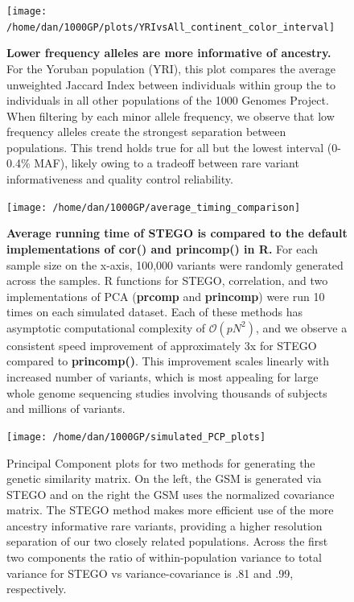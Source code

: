 \begin{figure}
\texttt{[image: /home/dan/1000GP/plots/YRIvsAll\_continent\_color\_interval]}\label{YRIvsX}\caption{\textbf{Lower frequency alleles are more informative of ancestry.
}For the Yoruban population (YRI), this plot compares the average
unweighted Jaccard Index between individuals within group the to individuals
in all other populations of the 1000 Genomes Project. When filtering
by each minor allele frequency, we observe that low frequency alleles
create the strongest separation between populations. This trend holds
true for all but the lowest interval (0-0.4\% MAF), likely owing to
a tradeoff between rare variant informativeness and quality control
reliability.}
\end{figure}

\begin{figure}
\texttt{[image: /home/dan/1000GP/average\_timing\_comparison]}\caption{\textbf{Average running time of STEGO is compared to the default implementations
of \textbf{cor()} and \textbf{princomp()} in R.} For each sample
size on the x-axis, 100,000 variants were randomly generated across
the samples. R functions for STEGO, correlation, and two implementations
of PCA (\textbf{prcomp }and \textbf{princomp}) were run 10 times on
each simulated dataset. Each of these methods has asymptotic computational
complexity of $\mathcal{O}(pN^{2})$, and we observe a consistent
speed improvement of approximately 3x for STEGO compared to \textbf{princomp()}.
This improvement scales linearly with increased number of variants,
which is most appealing for large whole genome sequencing studies
involving thousands of subjects and millions of variants.}
\label{comp_time}
\end{figure}

\begin{figure}
\texttt{[image: /home/dan/1000GP/simulated\_PCP\_plots]}\caption{Principal Component plots for two methods for generating the genetic
similarity matrix. On the left, the GSM is generated via STEGO and
on the right the GSM uses the normalized covariance matrix. The STEGO
method makes more efficient use of the more ancestry informative rare
variants, providing a higher resolution separation of our two closely
related populations. Across the first two components the ratio of
within-population variance to total variance for STEGO vs variance-covariance
is .81 and .99, respectively.}
\label{simulatedPCP}
\end{figure}

